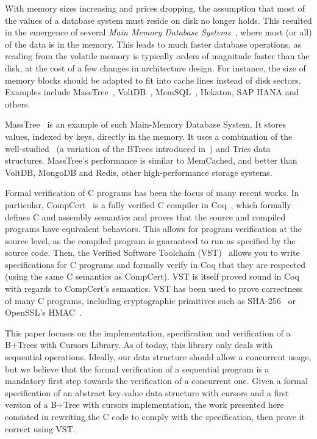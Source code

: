   With memory sizes increasing and prices dropping, the assumption that most of the values of a database system must reside on disk no longer holds.
  This resulted in the emergence of several \textit{Main Memory Database Systems}~\cite{mmdb}, where most (or all) of the data is in the memory.
  This leads to much faster database operations, as reading from the volatile memory is typically orders of magnitude faster than the disk, at the cost of a few changes in architecture design.
  For instance, the size of memory blocks should be adapted to fit into cache lines instead of disk sectors.
  Examples include MassTree~\cite{masstree}, VoltDB~\cite{voltdb}, MemSQL~\cite{memsql}, Hekaton, SAP HANA and others.

  MassTree~\cite{masstree} is an example of such Main-Memory Database System.
  It stores values, indexed by keys, directly in the memory.
  It uses a combination of the well-studied \btrees\ (a variation of the BTrees introduced in~\cite{btrees}) and Tries data structures.
  MassTree's performance is similar to MemCached, and better than VoltDB, MongoDB and Redis, other high-performance storage systems.

  Formal verification of C programs has been the focus of many recent works.
  In particular, CompCert~\cite{compcert,compcert2} is a fully verified C compiler in Coq~\cite{coq}, which formally defines C and assembly semantics and proves that the source and compiled programs have equivalent behaviors.
  This allows for program verification at the source level, as the compiled program is guaranteed to run as specified by the source code.
  Then, the Verified Software Toolchain (VST)~\cite{vst} allows you to write specifications for C programs and formally verify in Coq that they are respected (using the same C semantics as CompCert).
  VST is itself proved sound in Coq with regards to CompCert's semantics.
  VST has been used to prove correctness of many C programs, including cryptographic primitives such as SHA-256~\cite{sha} or OpenSSL's HMAC~\cite{hmac}.

  This paper focuses on the implementation, specification and verification of a B+Trees with Cursors Library.
  As of today, this library only deals with sequential operations.
  Ideally, our data structure should allow a concurrent usage, but we believe that the formal verification of a sequential program is a mandatory first step towards the verification of a concurrent one.
  Given a formal specification of an abstract key-value data structure with cursors and a first version of a B+Tree with cursors implementation, the work presented here consisted in rewriting the C code to comply with the specification, then prove it correct using VST.

